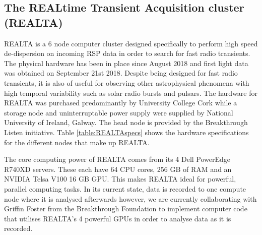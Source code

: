\subsection{The REALtime Transient Acquisition cluster (REALTA)} 
\label{sec:REALTA}
REALTA is a 6 node computer cluster designed specifically to perform high speed de-dispersion on incoming RSP data in order to search for fast radio transients. The physical hardware has been in place since August 2018 and first light data was obtained on September 21st 2018. Despite being designed for fast radio transients, it is also of useful for observing other astrophysical phenomena with high temporal variability such as solar radio bursts and pulsars. The hardware for REALTA was purchased predominantly by University College Cork while a storage node and uninterruptable power supply were supplied by National University of Ireland, Galway. The head node is provided by the Breakthrough Listen initiative. Table \ref{table:REALTAspecs} shows the hardware specifications for the different nodes that make up REALTA.

The core computing power of REALTA comes from its 4 Dell PowerEdge R740XD servers. These each have 64 CPU cores, 256 GB of RAM and an NVIDIA Telsa V100 16 GB GPU. This makes REALTA ideal for powerful, parallel computing tasks. In its current state, data is recorded to one compute node where it is analysed afterwards however, we are currently collaborating with Griffin Foster from the Breakthrough Foundation to implement computer code that utilises REALTA's 4 powerful GPUs in order to analyse data as it is recorded. 


